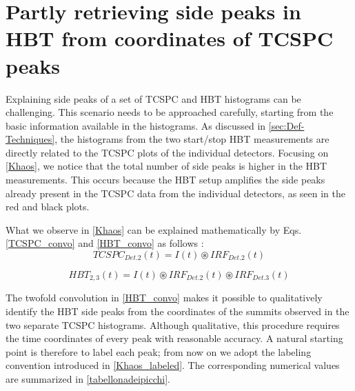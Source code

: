 \section{Partly retrieving side peaks in HBT from coordinates of TCSPC peaks}
\label{cpp:Reconstructsides}
Explaining side peaks of a set of TCSPC and HBT histograms can be challenging. 
This scenario needs to be approached carefully, starting from the basic information available in the histograms. As discussed in \autoref{sec:Def-Techniques}, the histograms from the two start/stop HBT measurements are directly related to the TCSPC plots of the individual detectors.
Focusing on \autoref{Khaos}, we notice that the total number of side peaks is higher in the HBT measurements. This occurs because the HBT setup amplifies the side peaks already present in the TCSPC data from the individual detectors, as seen in the red and black plots. 

What we observe in \autoref{Khaos} can be explained mathematically by Eqs.~ \ref{TCSPC_convo} and \ref{HBT_convo} as follows :
\begin{equation}
TCSPC_{Det.2}(t) = I(t) \circledast IRF_{Det.2}(t)
\label{TCSPC_convo}
\end{equation}

\begin{equation}
HBT_{2,3}(t) = I(t) \circledast IRF_{Det.2}(t) \circledast IRF_{Det.3}(t)
\label{HBT_convo}
\end{equation}

The twofold convolution in \autoref{HBT_convo} makes it possible to qualitatively identify the HBT side peaks from the coordinates of the summits observed in the two separate TCSPC histograms.
Although qualitative, this procedure requires the time coordinates of every peak with reasonable accuracy.
A natural starting point is therefore to label each peak; from now on we adopt the labeling convention introduced in \autoref{Khaos_labeled}.
The corresponding numerical values are summarized in \autoref{tabellonadeipicchi}.

